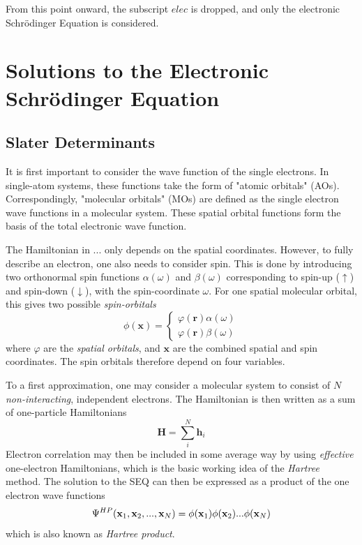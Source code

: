 From this point onward, the subscript $elec$ is dropped, and only the electronic Schrödinger Equation is considered.

\section{Solutions to the Electronic Schrödinger Equation}

\subsection{Slater Determinants}

It is first important to consider the wave function of the single electrons. In single-atom systems, these functions take the form of "atomic orbitals" (AOs). Correspondingly, "molecular orbitals" (MOs) are defined as the single electron wave functions in a molecular system. These spatial orbital functions form the basis of the total electronic wave function.  

The Hamiltonian in ... only depends on the spatial coordinates. However, to fully describe an electron, one also needs to consider spin. This is done by introducing two orthonormal spin functions $\alpha(\omega)$ and $\beta(\omega)$ corresponding to spin-up ($\uparrow$) and spin-down ($\downarrow$), with the spin-coordinate $\omega$. For one spatial molecular orbital, this gives two possible \emph{spin-orbitals}
\begin{equation}
\phi(\mathbf{x}) = \left\lbrace\begin{matrix}
\varphi(\mathbf{r}) \alpha(\omega) \\
\varphi(\mathbf{r}) \beta(\omega)
\end{matrix} \right.
\end{equation}
\noindent where $\varphi$ are the \emph{spatial orbitals}, and $\mathbf{x}$ are the combined spatial and spin coordinates. The spin orbitals therefore depend on four variables.

To a first approximation, one may consider a molecular system to consist of $N$ \emph{non-interacting}, independent electrons. The Hamiltonian is then written as a sum of one-particle Hamiltonians 
\begin{equation}
\mathbf{H} = \sum_i^N \mathbf{h}_i 
\end{equation}
\noindent Electron correlation may then be included in some average way by using \emph{effective} one-electron Hamiltonians, which is the basic working idea of the \emph{Hartree} method. The solution to the SEQ can then be expressed as a product of the one electron wave functions
\begin{equation}
\Psi^{HP}(\mathbf{x}_1,\mathbf{x}_2,...,\mathbf{x}_N) = \phi(\mathbf{x}_1) \phi(\mathbf{x}_2) ... \phi(\mathbf{x}_N)
\end{equation}
\noindent which is also known as \emph{Hartree product}. 

